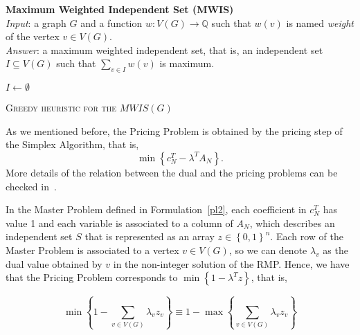\documentclass[fleqn,10pt]{SelfArx} %
\newcommand{\chaves}[1] {\ensuremath{{\left \{ {#1} \right \}}}}
\newcommand{\Min}[1] {\ensuremath{\min\chaves{#1}}}
\newcommand{\Max}[1] {\ensuremath{\max\chaves{#1}}}
\begin{document}
	\begin{samepage}
		\begin{framed}
			\textbf{Maximum Weighted Independent Set (MWIS)}\\
			\emph{Input}: a graph $G$ and a function $w: V(G) \rightarrow \mathbb{Q}$ such that $w(v)$ is named \emph{weight} of the vertex $v \in V(G)$. \\
			\emph{Answer}: a maximum weighted independent set, that is, an independent set $I \subseteq V(G)$ such that $\displaystyle\sum_{v \in I} w(v)$ is maximum.
		\end{framed}
	\end{samepage}
	
	\begin{algorithm}[h]
		\SetAlgoNoLine
		$I \gets \emptyset$\\
		\caption{\textsc{Greedy heuristic for the $MWIS(G)$}}\label{alg:9}
	\end{algorithm}
	
	
	As we mentioned before, the Pricing Problem is obtained by the pricing
	step of the Simplex Algorithm, that is, $$\Min{c_N^{T} - \lambda^{T}A_{N}}\text{.}$$ More details of the relation between the dual and the pricing problems can be checked in~\cite{desaulniers2006}.
	
	In the Master Problem defined in Formulation~\eqref{pl2}, each coefficient in $c_N^T$ has value 1 and each
	variable is associated to a column of $A_N$, which describes an
	independent set $S$ that is represented as an array $z \in
	{\chaves{0,1}}^n$. Each row of the Master Problem is associated to a vertex
	$v \in V(G)$, so we can denote $\lambda_v$ as the dual value obtained by $v$
	in the non-integer solution of the RMP\@. Hence, we have that the
	Pricing Problem corresponds to $\Min{1-\lambda^{T}z}$, that is, 
	
	\begin{equation*}
	\Min{
		1-\displaystyle\sum\limits_{v \in V(G)} \lambda_v z_v} \equiv 1 -
	\Max{\displaystyle\sum\limits_{v \in V(G)} \lambda_v z_v}
	\end{equation*}
	
\end{document}
